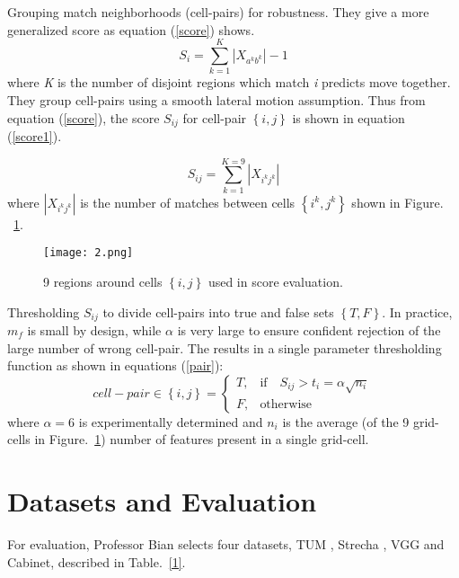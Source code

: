 \documentclass[twocolumn]{article}
\begin{document}
	Grouping match neighborhoods (cell-pairs) for robustness. They give a more generalized score as equation (\ref{score}) shows.
	\begin{equation}
     S_i = \sum_{k=1}^{K} \left| X_{a^k b^k} \right|-1 \label{score}
	\end{equation}
	where \emph{K} is the number of disjoint regions which match \emph{i} predicts move together.
	They group cell-pairs using a smooth lateral motion assumption. Thus from equation (\ref{score}), the score $S_{ij}$ for cell-pair $ \left\{i,j \right\} $ is shown in equation (\ref{score1}).
	
	\begin{equation}
	S_{ij} = \sum_{k=1}^{K=9} \left| X_{i^k j^k} \right| \label{score1}
	\end{equation}
	where $\left| X_{i^k j^k} \right|$ is the number of matches between cells
	$ \left\{i^k,j^k\right\} $ shown in Figure. ~\ref{cell}.

	\begin{figure}[ht]
		\centering
		\texttt{[image: 2.png]}
		\caption{9 regions around cells $ \left\{i,j\right\} $ used in score evaluation.}\label{cell}
	\end{figure}
	
	Thresholding $S_{ij}$ to divide cell-pairs into true and false sets $ \left\{T,F\right\} $. In practice, $m_{f}$ is small by design, while $\alpha$ is very large to ensure confident rejection of the large number of wrong cell-pair. The results in a single parameter thresholding function as shown in equations (\ref{pair}):
	\begin{equation}
	cell-pair \in \left\{i,j\right\}=
	\begin{cases}
	T, & \mbox{if} \quad S_{ij} > t_{i} = \alpha \sqrt{n_{i}} \\
	F, & \mbox{otherwise}
	\end{cases}   \label{pair}
	\end{equation}
	where $\alpha = 6$ is experimentally determined and $n_{i}$ is the average (of the 9 grid-cells in Figure.~\ref{cell}) number of features present in a single grid-cell.
	
	\section{Datasets and Evaluation}
	For evaluation, Professor Bian selects four datasets, TUM \cite{Sturm2012A}, Strecha \cite{Strecha2008On}, VGG \cite{Mikolajczyk2005A} and Cabinet\cite{Sturm2012A}, described in Table.~\ref{1}. 
	
\end{document}
